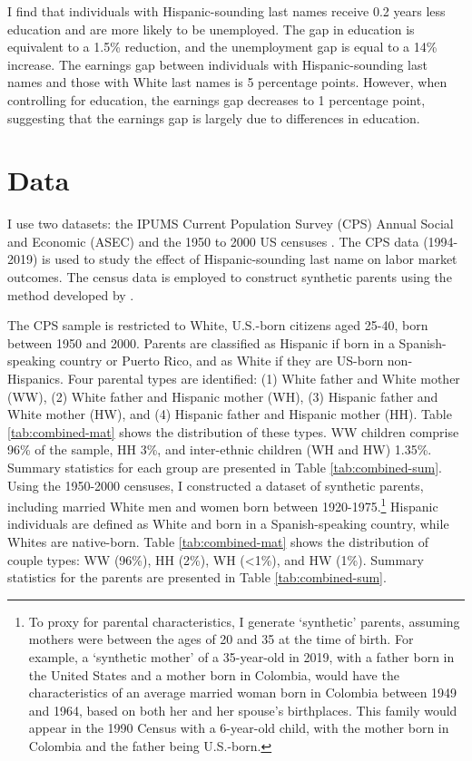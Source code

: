 \documentclass[a4paper,fleqn]{cas-sc}
\begin{document}
I find that individuals with Hispanic-sounding last names receive 0.2 years less education and are more likely to be unemployed. The gap in education is equivalent to a 1.5\% reduction, and the unemployment gap is equal to a 14\% increase. The earnings gap between individuals with Hispanic-sounding last names and those with White last names is 5 percentage points. However, when controlling for education, the earnings gap decreases to 1 percentage point, suggesting that the earnings gap is largely due to differences in education.

\section{Data}\label{sec:data}

I use two datasets: the IPUMS Current Population Survey (CPS) Annual Social and Economic (ASEC) \citep{cps2019} and the 1950 to 2000 US censuses \citep{acs2019}. The CPS data (1994-2019) is used to study the effect of Hispanic-sounding last name on labor market outcomes. The census data is employed to construct synthetic parents using the method developed by \citet{rubinstein2014pride}.

The CPS sample is restricted to White, U.S.-born citizens aged 25-40, born between 1950 and 2000. Parents are classified as Hispanic if born in a Spanish-speaking country or Puerto Rico, and as White if they are US-born non-Hispanics. Four parental types are identified: (1) White father and White mother (WW), (2) White father and Hispanic mother (WH), (3) Hispanic father and White mother (HW), and (4) Hispanic father and Hispanic mother (HH). Table \ref{tab:combined-mat} shows the distribution of these types. WW children comprise 96\% of the sample, HH 3\%, and inter-ethnic children (WH and HW) 1.35\%. Summary statistics for each group are presented in Table \ref{tab:combined-sum}. Using the 1950-2000 censuses, I constructed a dataset of synthetic parents, including married White men and women born between 1920-1975.\footnote{To proxy for parental characteristics, I generate `synthetic' parents, assuming mothers were between the ages of 20 and 35 at the time of birth. For example, a `synthetic mother' of a 35-year-old in 2019, with a father born in the United States and a mother born in Colombia, would have the characteristics of an average married woman born in Colombia between 1949 and 1964, based on both her and her spouse's birthplaces. This family would appear in the 1990 Census with a 6-year-old child, with the mother born in Colombia and the father being U.S.-born.} Hispanic individuals are defined as White and born in a Spanish-speaking country, while Whites are native-born. Table \ref{tab:combined-mat} shows the distribution of couple types: WW (96\%), HH (2\%), WH (<1\%), and HW (1\%). Summary statistics for the parents are presented in Table \ref{tab:combined-sum}.
\end{document}
